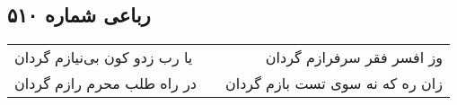 \begin{center}
\section*{رباعی شماره ۵۱۰}
\label{sec:sh510}
\begin{longtable}{l p{0.5cm} r}
یا رب زدو کون بی‌نیازم گردان
&&
وز افسر فقر سرفرازم گردان
\\
در راه طلب محرم رازم گردان
&&
زان ره که نه سوی تست بازم گردان
\\
\end{longtable}
\end{center}
